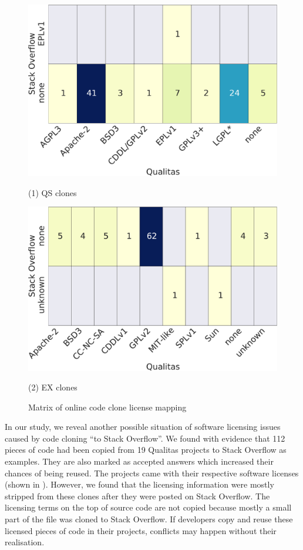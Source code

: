 \documentclass[sigconf,review, anonymous]{acmart}
\begin{document}
\begin{figure}
		\centering
		\begin{minipage}{.4\textwidth}
			\centering
			\includegraphics[width=\linewidth]{heatmap_a-crop}
			\caption*{(1) QS clones}\label{fig:heatmap_a}
		\end{minipage}%
		\hspace{5ex}
		\begin{minipage}{0.41\textwidth}
			\centering
			\includegraphics[width=\linewidth]{heatmap_c-crop}
			\caption*{(2) EX clones}\label{fig:heatmap_c}
		\end{minipage}
	\caption{Matrix of online code clone license mapping}
\end{figure}

In our study, we reveal another possible situation of software licensing issues caused by code cloning ``to Stack Overflow''. We found with evidence that 112 pieces of code had been copied from 19 Qualitas projects to Stack Overflow as examples. They are also marked as accepted answers which increased their chances of being reused. The projects came with their respective software licenses (shown in ). However, we found that the licensing information were mostly stripped from these clones after they were posted on Stack Overflow. The licensing terms on the top of source code are not copied because mostly a small part of the file was cloned to Stack Overflow. If developers copy and reuse these licensed pieces of code in their projects, conflicts may happen without their realisation. 
\end{document}

